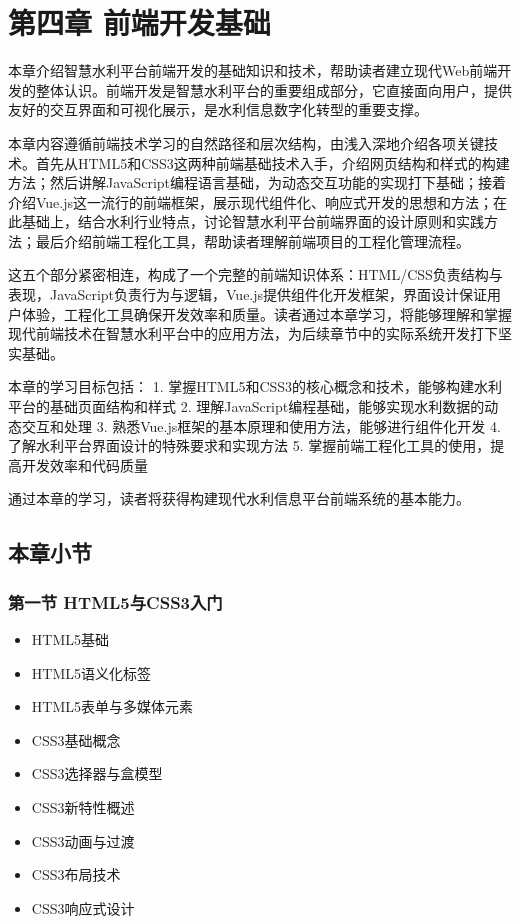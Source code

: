 \section{第四章
前端开发基础}\label{ux7b2cux56dbux7ae0-ux524dux7aefux5f00ux53d1ux57faux7840}

本章介绍智慧水利平台前端开发的基础知识和技术，帮助读者建立现代Web前端开发的整体认识。前端开发是智慧水利平台的重要组成部分，它直接面向用户，提供友好的交互界面和可视化展示，是水利信息数字化转型的重要支撑。

本章内容遵循前端技术学习的自然路径和层次结构，由浅入深地介绍各项关键技术。首先从HTML5和CSS3这两种前端基础技术入手，介绍网页结构和样式的构建方法；然后讲解JavaScript编程语言基础，为动态交互功能的实现打下基础；接着介绍Vue.js这一流行的前端框架，展示现代组件化、响应式开发的思想和方法；在此基础上，结合水利行业特点，讨论智慧水利平台前端界面的设计原则和实践方法；最后介绍前端工程化工具，帮助读者理解前端项目的工程化管理流程。

这五个部分紧密相连，构成了一个完整的前端知识体系：HTML/CSS负责结构与表现，JavaScript负责行为与逻辑，Vue.js提供组件化开发框架，界面设计保证用户体验，工程化工具确保开发效率和质量。读者通过本章学习，将能够理解和掌握现代前端技术在智慧水利平台中的应用方法，为后续章节中的实际系统开发打下坚实基础。

本章的学习目标包括： 1.
掌握HTML5和CSS3的核心概念和技术，能够构建水利平台的基础页面结构和样式 2.
理解JavaScript编程基础，能够实现水利数据的动态交互和处理 3.
熟悉Vue.js框架的基本原理和使用方法，能够进行组件化开发 4.
了解水利平台界面设计的特殊要求和实现方法 5.
掌握前端工程化工具的使用，提高开发效率和代码质量

通过本章的学习，读者将获得构建现代水利信息平台前端系统的基本能力。

\subsection{本章小节}\label{ux672cux7ae0ux5c0fux8282}

\subsubsection{第一节
HTML5与CSS3入门}\label{ux7b2cux4e00ux8282-html5ux4e0ecss3ux5165ux95e8}

\begin{itemize}
\tightlist
\item
  HTML5基础
\item
  HTML5语义化标签
\item
  HTML5表单与多媒体元素
\item
  CSS3基础概念
\item
  CSS3选择器与盒模型
\item
  CSS3新特性概述
\item
  CSS3动画与过渡
\item
  CSS3布局技术
\item
  CSS3响应式设计
\end{itemize}

